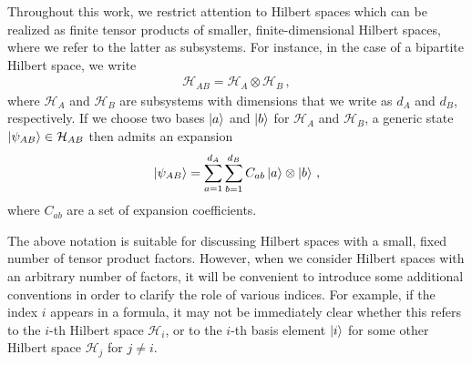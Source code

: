 \documentclass[12pt]{article}
\numberwithin{equation}{section}
\begin{document}
Throughout this work, we restrict attention to Hilbert spaces which can be realized as finite tensor products of smaller, finite-dimensional Hilbert spaces, where we refer to the latter as subsystems. For instance, in the case of a bipartite Hilbert space, we write
%
\begin{align}
    \mathcal{H}_{AB} = \mathcal{H}_A \otimes \mathcal{H}_B \, ,
\end{align}
%
where $\mathcal{H}_A$ and $\mathcal{H}_B$ are subsystems with dimensions that we write as $d_A$ and $d_B$, respectively. If we choose two bases $\ket{a}$ and $\ket{b}$ for $\mathcal{H}_A$ and $\mathcal{H}_B$, a generic state $\ket{\psi_{AB}} \in \mathcal{H}_{AB}$ then admits an expansion
%
\begin{align}\label{bipartite_expansion}
    \ket{\psi_{AB}} = \sum_{a = 1}^{d_A} \sum_{b=1}^{d_B} C_{ab} \ket{a} \otimes \ket{b} \, ,
\end{align}
%
where $C_{ab}$ are a set of expansion coefficients.

The above notation is suitable for discussing Hilbert spaces with a small, fixed number of tensor product factors. However, when we consider Hilbert spaces with an arbitrary number of factors, it will be convenient to introduce some additional conventions in order to clarify the role of various indices. For example, if the index $i$ appears in a formula, it may not be immediately clear whether this refers to the $i$-th Hilbert space $\mathcal{H}_i$, or to the $i$-th basis element $\ket{ i }$ for some other Hilbert space $\mathcal{H}_j$ for $j \neq i$.
\end{document}
